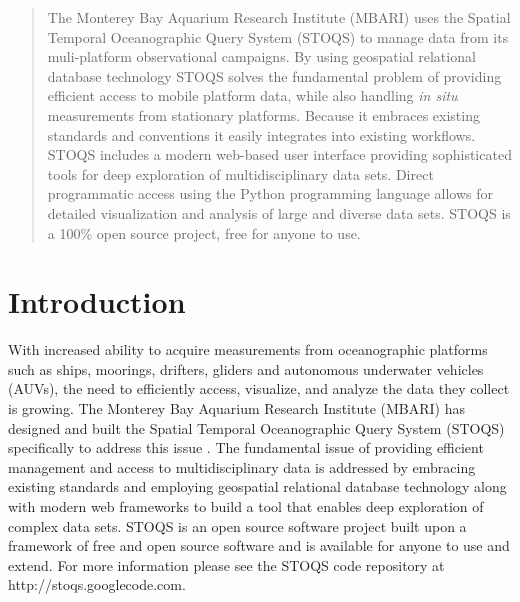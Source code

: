 \documentclass[conference]{IEEEtran}
\begin{document}
\begin{abstract}

The Monterey Bay Aquarium Research Institute (MBARI) uses the Spatial Temporal Oceanographic Query System (STOQS) to manage data from its muli-platform observational campaigns. By using geospatial relational database technology STOQS solves the fundamental problem of providing efficient access to mobile platform data, while also handling \textit{in situ} measurements from stationary platforms. Because it embraces existing standards and conventions it easily integrates into existing workflows. STOQS includes a modern web-based user interface providing sophisticated tools for deep exploration of multidisciplinary data sets. Direct programmatic access using the Python programming language allows for detailed visualization and analysis of large and diverse data sets. STOQS is a 100\% open source project, free for anyone to use.

\end{abstract}





%
\IEEEpeerreviewmaketitle


\section{Introduction}

With increased ability to acquire measurements from oceanographic platforms such as ships, moorings, drifters, gliders and autonomous underwater vehicles (AUVs), the need to efficiently access, visualize, and analyze the data they collect is growing. The Monterey Bay Aquarium Research Institute (MBARI) has designed and built the Spatial Temporal Oceanographic Query System (STOQS) specifically to address this issue \cite{imdis2013}. The fundamental issue of providing efficient management and access to multidisciplinary data is addressed by embracing existing standards and employing geospatial relational database technology along with modern web frameworks to build a tool that enables deep exploration of complex data sets. STOQS is an open source software project built upon a framework of free and open source software and is available for anyone to use and extend. For more information please see the STOQS code repository at http://stoqs.googlecode.com.
\end{document}
